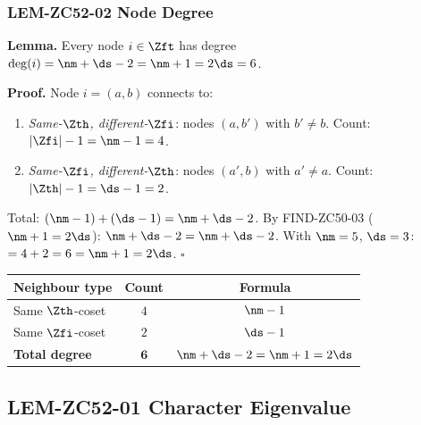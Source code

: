 \documentclass[12pt, a4paper]{article}
\begin{document}
\subsubsection{LEM-ZC52-02 \quad Node Degree}


\begin{formalbox}[title={LEM-ZC52-02: Degree $= n_m+1 = 2d_s = 6$
  (Exact, $R_0$)}]
\textbf{Lemma.}
Every node $i\in\Zft$ has degree $\deg(i) = \nm+\ds-2 = \nm+1 = 2\ds = 6$.

\textbf{Proof.}
Node $i=(a,b)$ connects to:
\begin{enumerate}[leftmargin=2em, noitemsep]
\item \emph{Same-$\Zth$, different-$\Zfi$}: nodes $(a,b')$ with $b'\neq b$.
  Count: $|\Zfi|-1 = \nm-1 = 4$.
\item \emph{Same-$\Zfi$, different-$\Zth$}: nodes $(a',b)$ with $a'\neq a$.
  Count: $|\Zth|-1 = \ds-1 = 2$.
\end{enumerate}
Total: $(\nm-1)+(\ds-1) = \nm+\ds-2$.
By FIND-ZC50-03 ($\nm+1=2\ds$): $\nm+\ds-2 = \nm+\ds-2$.
With $\nm=5$, $\ds=3$: $= 4+2 = 6 = \nm+1 = 2\ds$. \hfill$\square$

\begin{center}
\begin{tabular}{@{}lcc@{}}
\toprule
Neighbour type & Count & Formula \\
\midrule
Same $\Zth$-coset & $4$ & $\nm - 1$ \\
Same $\Zfi$-coset & $2$ & $\ds - 1$ \\
\midrule
\textbf{Total degree} & $\mathbf{6}$ &
  $\nm+\ds-2 = \nm+1 = 2\ds$ \\
\bottomrule
\end{tabular}
\end{center}
\end{formalbox}

\subsection{LEM-ZC52-01 \quad Character Eigenvalue}

\end{document}
